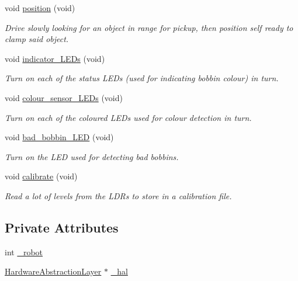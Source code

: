 \begin{DoxyCompactItemize}
void \hyperlink{classIDP_1_1SelfTests_ada3dfe991573fc6b0922cace927fc4e0}{position} (void)
\begin{DoxyCompactList}\small\item\em Drive slowly looking for an object in range for pickup, then position self ready to clamp said object. \item\end{DoxyCompactList}\item 
void \hyperlink{classIDP_1_1SelfTests_acd6d4a493850445419843cefc4d25bc3}{indicator\_\-LEDs} (void)
\begin{DoxyCompactList}\small\item\em Turn on each of the status LEDs (used for indicating bobbin colour) in turn. \item\end{DoxyCompactList}\item 
void \hyperlink{classIDP_1_1SelfTests_a1380b0222eef47f6d50e7cf334e4c9e7}{colour\_\-sensor\_\-LEDs} (void)
\begin{DoxyCompactList}\small\item\em Turn on each of the coloured LEDs used for colour detection in turn. \item\end{DoxyCompactList}\item 
void \hyperlink{classIDP_1_1SelfTests_aa32598325a69ed2b02e1540704d8bc06}{bad\_\-bobbin\_\-LED} (void)
\begin{DoxyCompactList}\small\item\em Turn on the LED used for detecting bad bobbins. \item\end{DoxyCompactList}\item 
void \hyperlink{classIDP_1_1SelfTests_a1f59c76873f58a7100cd1a4b7ac3e044}{calibrate} (void)
\begin{DoxyCompactList}\small\item\em Read a lot of levels from the LDRs to store in a calibration file. \item\end{DoxyCompactList}\end{DoxyCompactItemize}
\subsection*{Private Attributes}
\begin{DoxyCompactItemize}
\item 
int \hyperlink{classIDP_1_1SelfTests_a90c60ce647f723e9a37339aadba4770c}{\_\-robot}
\item 
\hyperlink{classIDP_1_1HardwareAbstractionLayer}{HardwareAbstractionLayer} $\ast$ \hyperlink{classIDP_1_1SelfTests_a1f8a6f6c2ff26182311c8a7766db6f5a}{\_\-hal}
\end{DoxyCompactItemize}



